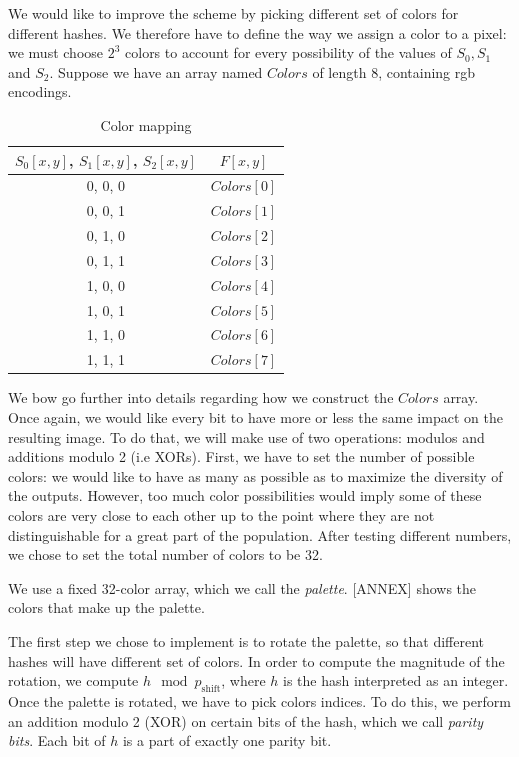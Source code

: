 \documentclass{article}
\begin{document}
We would like to improve the scheme by picking different set of colors for different hashes. We therefore have to define the way we assign a color to a pixel: we must choose $2^3$ colors to account for every possibility of the values of $S_0, S_1$ and $S_2$. Suppose we have an array named $Colors$ of length 8, containing rgb encodings.
\begin{table}
	\begin{center}
	\begin{tabular}{c|c}
		$S_0[x,y]$, $S_1[x,y]$, $S_2[x,y]$ & $F[x,y]$\\
		\hline 0,   0,   0 & $Colors[0]$\\
		 0, 0, 1 & $Colors[1]$\\
		 0, 1, 0 & $Colors[2]$\\
		 0, 1, 1 & $Colors[3]$\\
		 1, 0, 0 & $Colors[4]$\\
		 1, 0, 1 & $Colors[5]$\\
		 1, 1, 0 & $Colors[6]$\\
		 1, 1, 1 & $Colors[7]$\\
	\end{tabular}
	\caption{Color mapping}
	\end{center}
\end{table}

We bow go further into details regarding how we construct the $Colors$ array. Once again, we would like every bit to have more or less the same impact on the resulting image. To do that, we will make use of two operations: modulos and additions modulo 2 (i.e XORs). First, we have to set the number of possible colors: we would like to have as many as possible as to maximize the diversity of the outputs. However, too much color possibilities would imply some of these colors are very close to each other up to the point where they are not distinguishable for a great part of the population. After testing different numbers, we chose to set the total number of colors to be 32.

We use a fixed 32-color array, which we call the \textit{palette}. [ANNEX] shows the colors that make up the palette.

The first step we chose to implement is to rotate the palette, so that different hashes will have different set of colors. In order to compute the magnitude of the rotation, we compute $h \mod p_{\text{shift}}$, where $h$ is the hash interpreted as an integer. Once the palette is rotated, we have to pick colors indices. To do this, we perform an addition modulo 2 (XOR) on certain bits of the hash, which we call \textit{parity bits}. Each bit of $h$ is a part of exactly one parity bit.
\end{document}
